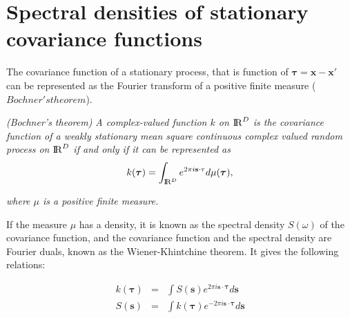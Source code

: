 \documentclass[]{interact}
\theoremstyle{plain}%
\theoremstyle{definition}
\theoremstyle{remark}
\begin{document}
 

\section{Spectral densities of stationary covariance functions}

The covariance function of a stationary process, that is function of $\boldsymbol{\tau}=\mathbf{x-x'}$ can be represented as the Fourier transform of a positive finite measure ($Bochner's theorem$). 

\vspace{0.2cm}
\textit{(Bochner’s theorem) A complex-valued function $k$ on ${\rm I\!R}^D$ is the covariance function of a weakly stationary mean square continuous complex valued random process on ${\rm I\!R}^D$ if and only if it can be represented as}
%
\begin{equation}
k(\boldsymbol{\tau})= \int_{{\rm I\!R}^D} e^{2\pi i \mathbf{s} \cdot \mathbf{\tau}} d\mu(\boldsymbol{\tau}), \nonumber 
\end{equation}

\textit{where $\mu$ is a positive finite measure.} 

\vspace{0.2cm}
If the measure $\mu$ has a density, it is known as the spectral density $S(\omega)$ of the covariance function, and the covariance function and the spectral density are Fourier duals, known as the Wiener-Khintchine theorem. It gives the following relations:

\begin{eqnarray}
k(\boldsymbol{\tau})&=& \int S(\mathbf{s}) e^{2\pi i \mathbf{s} \cdot \boldsymbol{\tau}} d\mathbf{s}  \nonumber \\
%
S(\mathbf{s})&=& \int k(\boldsymbol{\tau}) e^{-2\pi i \mathbf{s} \cdot \boldsymbol{\tau}} d\mathbf{s}  \nonumber
\end{eqnarray}
\end{document}
